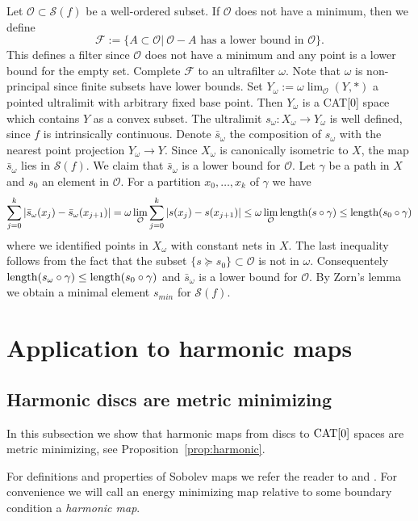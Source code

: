 \documentclass[a4paper,10pt]{amsart}
\begin{document}
Let $\mathcal{O}\subset\mathcal{S}(f)$ be a well-ordered subset. If $\mathcal{O}$ does not
have a minimum, then we define
$$
\mathcal{F}:=\{A\subset\mathcal{O}|\ \mathcal{O}-A\text{ has a lower bound in }\mathcal{O}\}.
$$
This defines a filter since $\mathcal{O}$ does not have a minimum and any point is a lower bound for the empty set.
Complete $\mathcal{F}$ to an ultrafilter $\omega$. Note that $\omega$ is non-principal since finite subsets have lower bounds.
Set $Y_\omega:=\omega\lim_{\mathcal{O}}(Y,*)$ a pointed ultralimit with arbitrary fixed base point. Then $Y_\omega$
is a CAT[0] space which contains $Y$ as a convex subset. The ultralimit $s_\omega:X_\omega\to Y_\omega$ is well defined, since
$f$ is intrinsically continuous. Denote $\bar s_\omega$ the composition of $s_\omega$ with the nearest point projection $Y_\omega\to Y$.
Since $X_\omega$ is canonically isometric to $X$, the map $\bar s_\omega$ lies in $\mathcal{S}(f)$. We claim that $\bar s_\omega$
is a lower bound for $\mathcal{O}$. Let $\gamma$ be a path in $X$ and $s_0$ an element in $\mathcal{O}$. For a partition $x_0,\ldots,x_k$
of $\gamma$ we have
$$
\sum_{j=0}^k|\bar s_\omega(x_j)-\bar s_\omega(x_{j+1})|=\omega\lim_{\mathcal{O}}\sum_{j=0}^k|s(x_j)-s(x_{j+1})|\leq \omega\lim_{\mathcal{O}}\mathop{\rm length}\nolimits(s\circ\gamma)\leq \mathop{\rm length}\nolimits(s_0\circ\gamma)
$$
where we identified points in $X_\omega$ with constant nets in $X$. The last inequality follows from the fact that the subset $\{s\succcurlyeq s_0\}\subset \mathcal{O}$
is not in $\omega$. Consequentely $\mathop{\rm length}\nolimits(s_\omega\circ\gamma)\leq \mathop{\rm length}\nolimits(s_0\circ\gamma)$ and $\bar s_\omega$
is a lower bound for $\mathcal{O}$. By Zorn's lemma we obtain a minimal element $s_{min}$ for $\mathcal{S}(f)$.
\qeds





\section{Application to harmonic maps}

\subsection{Harmonic discs are metric minimizing}

In this subsection we show that harmonic maps from discs to $\mathop{\rm CAT}\nolimits[0]$ spaces are metric minimizing, see Proposition~\ref{prop:harmonic}.

For definitions and properties of Sobolev maps we refer the reader to \cite{LW} and \cite{LW2}. For convenience we will call
an energy minimizing map relative to some boundary condition a {\em harmonic map}.
\end{document}
